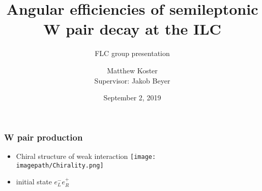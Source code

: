 

\title[Angular efficiencies of semileptonic W pair decay at the ILC]{Angular efficiencies of semileptonic W pair decay at the ILC}
\subtitle{FLC group presentation}
\author[Matthew Koster]{Matthew Koster \\Supervisor: Jakob Beyer }%
\date{September 2, 2019}

\newcommand{\imagepath}{../Plots}
\newcommand{\feynmanpath}{../FeynmanDiagrams}





\makemytitlepage


\begin{frame}\frametitle{W pair production }

    \begin{minipage}{0.49\textwidth}
        \begin{itemize}
            \setlength\itemsep{2em}
            \item Chiral structure of weak interaction
            \texttt{[image: \\imagepath/Chirality.png]}
            \item initial state ${e}_{L}^{-} {e}_{R}^{+}$
        \end{itemize}
    \end{minipage}
    \begin{minipage}{0.49\textwidth}
        \centering
        
        \bigskip
        \centering
        
    \end{minipage}

\end{frame}


